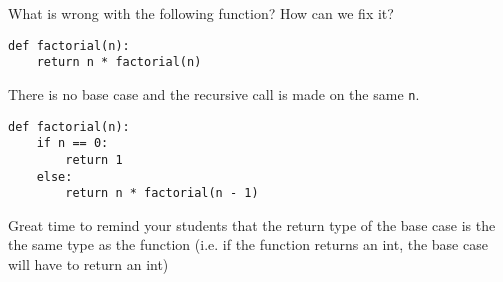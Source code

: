 \begin{blocksection}
\question What is wrong with the following function? How can we fix it?

\begin{lstlisting}
def factorial(n):
    return n * factorial(n)
\end{lstlisting}

\begin{solution}[1in]
There is no base case and the recursive call is made on the same \lstinline{n}.

\begin{lstlisting}
def factorial(n):
    if n == 0:
        return 1
    else:
        return n * factorial(n - 1)
\end{lstlisting}
\end{solution}

\begin{questionmeta}
    Great time to remind your students that the return type of the base case is the
     the same type as the function (i.e. if the function returns an int, the base case will have to return an int)
\end{questionmeta}
\end{blocksection}
